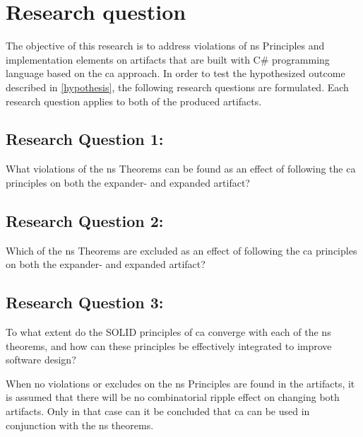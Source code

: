 \section{Research question} \label{sec_research_questions}

The objective of this research is to address violations of \gls{ns} Principles
and implementation elements on artifacts that are built with C\# programming language
based on the \gls{ca} approach. In order to test the hypothesized outcome
described in \ref{hypothesis}, the following research questions are formulated. Each
research question applies to both of the produced artifacts.

\subsection*{Research Question 1:} \label{rq1}
What violations of the \gls{ns} Theorems can be found as an effect of
following the \gls{ca} principles on both the expander- and expanded artifact?

\subsection*{Research Question 2:} \label{rq2}
Which of the \gls{ns} Theorems are excluded as an effect of following the
\gls{ca} principles on both the expander- and expanded artifact?

\subsection*{Research Question 3:} \label{rq3}
To what extent do the SOLID principles of \gls{ca} converge with each of the
\gls{ns} theorems, and how can these principles be effectively integrated to
improve software design?

When no violations or excludes on the \gls{ns} Principles are found in the
artifacts, it is assumed that there will be no combinatorial ripple effect on changing
both artifacts. Only in that case can it be concluded that \gls{ca} can be
used in conjunction with the \gls{ns} theorems. 